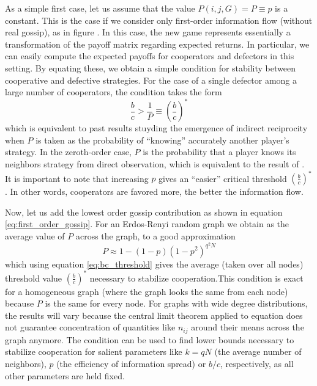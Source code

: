 \documentclass{article}
\renewcommand{\=}[1]{\stackrel{#1}{=}} %
\begin{document}
As a simple first case, let us assume that the value
$P(i,j,G) = P \equiv p$ is a constant. This is the case if we consider only first-order information flow (without real gossip), as in figure \protect{}. In this case, the new game
represents essentially a transformation of the payoff matrix regarding
expected returns. In particular, we can easily compute the expected payoffs for cooperators and defectors in this setting. By equating these, we obtain a simple condition for stability between cooperative and defective strategies. For the case of a single defector among a large number of cooperators, the condition takes the form
\begin{equation}\label{eq:bc_threshold}
\frac{b}{c} > \frac{1}{P} \equiv \left( \frac{b}{c}\right)^*
\end{equation}
which is equivalent to past results stuyding the emergence of indirect reciprocity \cite{nowak1998evolution} when $P$ is taken as the probability of ``knowing'' accurately another player's strategy. In the zeroth-order case, $P$ is the probability that a player knows its neighbors strategy from direct observation, which is equivalent to the result of \cite{nowak2006five}.
It is important to note that increasing $p$ gives an ``easier'' critical threshold $\left( \frac{b}{c}\right)^*$. In other words, cooperators are favored more, the better the information flow.

Now, let us add the lowest order gossip contribution as shown in equation \ref{eq:first_order_gossip}.
For an Erdos-Renyi random graph we obtain as the average value of $P$ across the graph, to a good approximation
\begin{equation}\label{eq:P_first_order}
P \approx 1 - (1-p)(1-p^2)^{q^2N}
\end{equation}
which using equation \ref{eq:bc_threshold} gives the average (taken over all nodes) threshold value $\left( \frac{b}{c}\right)^*$ necessary to stabilize cooperation.This condition is exact for
a homogeneous graph (where the graph looks the same from each node) because $P$ is the same for every node. For graphs with wide degree distributions, the results will vary because the central limit theorem applied to equation \label{eq:first_order_gossip} does not guarantee concentration of quantities like $n_{ij}$ around their means across the graph anymore. The condition can be used to find lower bounds necessary to stabilize cooperation for salient parameters like $k = q N$ (the average number of neighbors), $p$ (the efficiency of information spread) or $b/c$, respectively, as all other parameters are held fixed.
\end{document}
